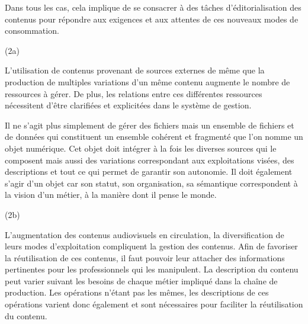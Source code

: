 \begin{liste}
	Dans tous les cas, cela implique de se consacrer à des tâches d'éditorialisation des contenus pour répondre aux exigences et aux attentes de ces nouveaux modes de consommation.\\


	\item[(2a)]  

	L'utilisation de contenus provenant de sources externes de même que la production de multiples variations d'un même contenu augmente le nombre de ressources à gérer. 
	De plus, les relations entre ces différentes ressources nécessitent d'être clarifiées et explicitées dans le système de gestion. 
	
	Il ne s'agit plus simplement de gérer des fichiers mais un ensemble de fichiers et de données qui constituent un ensemble cohérent et fragmenté que l'on nomme un objet numérique. 
	Cet objet doit intégrer à la fois les diverses sources qui le composent mais aussi des variations correspondant aux exploitations visées, des descriptions et tout ce qui permet de garantir son autonomie. 
	Il doit également s'agir d'un objet  car son statut, son organisation, sa sémantique correspondent à la vision d'un métier, à la manière dont il pense le monde. 



	\item[(2b)] 

	L'augmentation des contenus audiovisuels en circulation, la diversification de leurs modes d'exploitation compliquent la gestion des contenus.  
	Afin de favoriser la réutilisation de ces contenus, il faut pouvoir leur attacher des informations pertinentes pour les professionnels qui les manipulent. 
	La description du contenu peut varier suivant les besoins de chaque métier impliqué dans la chaîne de production. 
	Les opérations n'étant pas les mêmes, les descriptions de ces opérations varient donc également et sont nécessaires pour faciliter la réutilisation du contenu. 


\end{liste}
